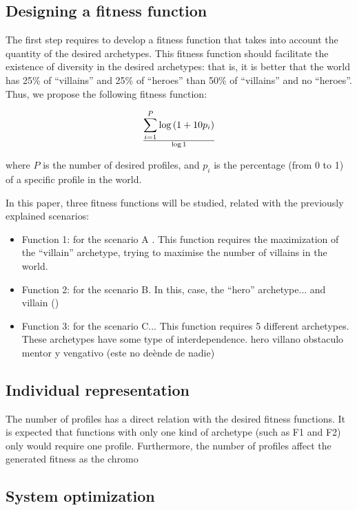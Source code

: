 \documentclass[runningheads,a4paper]{llncs}
\begin{document}
\subsection{Designing a fitness function}

The first step requires to develop a fitness function that takes into
account the quantity of the desired archetypes. This fitness function
should facilitate the existence of diversity in the desired
archetypes: that is, it is better that the world has 25\% of
``villains'' and 25\% of ``heroes'' than 50\% of ``villains'' and no
``heroes''. Thus, we propose the following fitness function: 

\begin{equation}
\sum _{i=1}^{P} {\log \left( 1+10p_{i}\right) } \over {\log 1}
\end{equation}

where $P$ is the number of desired profiles, and $p_{i}$ is the
percentage (from 0 to 1) of a specific profile in the world. %

In this paper, three fitness functions will be studied, related with the previously explained scenarios:
\begin{itemize}
\item Function 1: for the scenario A . This function requires the maximization of the ``villain'' archetype, trying to maximise the number of villains in the world. 
\item Function 2: for the scenario B. In this, case, the ``hero'' archetype... and villain ()
\item Function 3: for the scenario C... This function requires 5 different archetypes. These archetypes have some type of interdependence. hero villano obstaculo mentor y vengativo (este no deènde de nadie)
\end{itemize}

\subsection{Individual representation}

The number of profiles has a direct relation with the desired fitness functions. It is expected that functions with only one kind of archetype (such as F1 and F2) only would require one profile. Furthermore, the number of profiles affect the generated fitness as the chromo


\subsection{System optimization}
\end{document}
